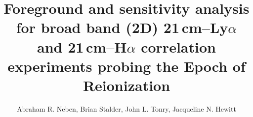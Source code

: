 \documentclass[numberedappendix]{emulateapj}
\begin{document}
\title{Foreground and sensitivity analysis for broad band (2D) 21\,\MakeLowercase{cm}--L\MakeLowercase{y}$\alpha$ and 21\,\MakeLowercase{cm}--H$\alpha$ correlation experiments probing the Epoch of Reionization}


\author{Abraham R. Neben,
Brian Stalder,
John L. Tonry,
Jacqueline N. Hewitt}



\end{document}

